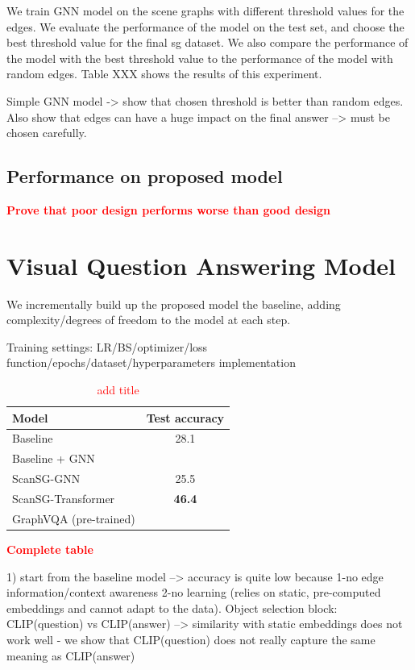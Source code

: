 We train GNN model on the scene graphs with different threshold values for the edges. We evaluate the performance of the model on the test set, and choose the best threshold value for the final sg dataset. We also compare the performance of the model with the best threshold value to the performance of the model with random edges. Table XXX shows the results of this experiment.

Simple GNN model -> show that chosen threshold is better than random edges.
Also show that edges can have a huge impact on the final answer --> must be chosen carefully.

\subsection{Performance on proposed model}
\textcolor{red}{\textbf{Prove that poor design performs worse than good design}}


\newpage
\section{Visual Question Answering Model}

We incrementally build up the proposed model the baseline, adding complexity/degrees of freedom to the model at each step.

Training settings: LR/BS/optimizer/loss function/epochs/dataset/hyperparameters implementation


\begin{table}[h!]
    \centering
    \caption{\textcolor{red}{add title}}
    \begin{tabular}{|l|c|}
    \hline
    \textbf{Model}         & \textbf{Test accuracy} \\ \hline
    Baseline               & 28.1                   \\ \hline
    Baseline + GNN         & \multicolumn{1}{l|}{}  \\ \hline
    ScanSG-GNN             & 25.5                   \\ \hline
    ScanSG-Transformer     & \textbf{46.4}          \\ \hline
    GraphVQA (pre-trained) & \multicolumn{1}{l|}{}  \\ \hline
    \end{tabular}
\end{table}

\textcolor{red}{\textbf{Complete table}}


1) start from the baseline model --> accuracy is quite low because 1-no edge information/context awareness 2-no learning (relies on static, pre-computed embeddings and cannot adapt to the data). Object selection block: CLIP(question) vs CLIP(answer) --> similarity with static embeddings does not work well - we show that CLIP(question) does not really capture the same meaning as CLIP(answer)

